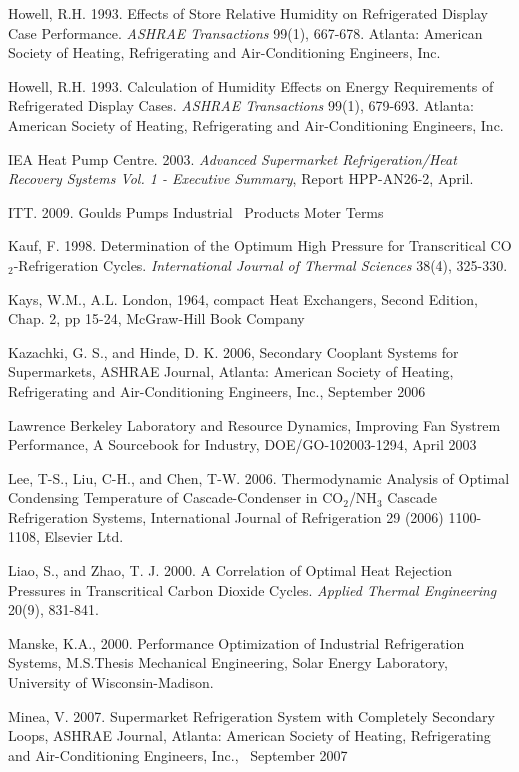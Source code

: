 Howell, R.H. 1993. Effects of Store Relative Humidity on Refrigerated Display Case Performance. \emph{ASHRAE Transactions} 99(1), 667-678. Atlanta: American Society of Heating, Refrigerating and Air-Conditioning Engineers, Inc.

Howell, R.H. 1993. Calculation of Humidity Effects on Energy Requirements of Refrigerated Display Cases. \emph{ASHRAE Transactions} 99(1), 679-693. Atlanta: American Society of Heating, Refrigerating and Air-Conditioning Engineers, Inc.

IEA Heat Pump Centre. 2003. \emph{Advanced Supermarket Refrigeration/Heat Recovery Systems Vol. 1 - Executive Summary}, Report HPP-AN26-2, April.

ITT. 2009. Goulds Pumps Industrial~ Products Moter Terms

Kauf, F. 1998. Determination of the Optimum High Pressure for Transcritical CO\(_{2}\)-Refrigeration Cycles. \emph{International Journal of Thermal Sciences} 38(4), 325-330.

Kays, W.M., A.L. London, 1964, compact Heat Exchangers, Second Edition, Chap. 2, pp 15-24, McGraw-Hill Book Company

Kazachki, G. S., and Hinde, D. K. 2006, Secondary Cooplant Systems for Supermarkets, ASHRAE Journal, Atlanta: American Society of Heating, Refrigerating and Air-Conditioning Engineers, Inc., September 2006

Lawrence Berkeley Laboratory and Resource Dynamics, Improving Fan Systrem Performance, A Sourcebook for Industry, DOE/GO-102003-1294, April 2003

Lee, T-S., Liu, C-H., and Chen, T-W. 2006. Thermodynamic Analysis of Optimal Condensing Temperature of Cascade-Condenser in CO\(_{2}\)/NH\(_{3}\) Cascade Refrigeration Systems, International Journal of Refrigeration 29 (2006) 1100-1108, Elsevier Ltd.

Liao, S., and Zhao, T. J. 2000. A Correlation of Optimal Heat Rejection Pressures in Transcritical Carbon Dioxide Cycles. \emph{Applied Thermal Engineering} 20(9), 831-841.

Manske, K.A., 2000. Performance Optimization of Industrial Refrigeration Systems, M.S.Thesis Mechanical Engineering, Solar Energy Laboratory, University of Wisconsin-Madison.

Minea, V. 2007. Supermarket Refrigeration System with Completely Secondary Loops, ASHRAE Journal, Atlanta: American Society of Heating, Refrigerating and Air-Conditioning Engineers, Inc., ~September 2007

